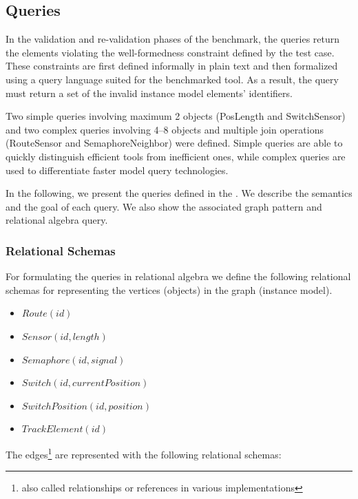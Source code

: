 \subsection{Queries}
\label{sec:queries}

In the validation and re-validation phases of the benchmark, the queries return the elements violating the well-formedness constraint defined by the test case. These constraints are first defined informally in plain text and then formalized using a query language suited for the benchmarked tool. As a result, the query must return a set of the invalid instance model elements' identifiers.
 
Two simple queries involving maximum 2 objects (\textsf{PosLength} and \textsf{SwitchSensor}) and two complex queries involving 4--8 objects and multiple join operations (\textsf{RouteSensor} and \textsf{SemaphoreNeighbor}) were defined. Simple queries are able to quickly distinguish efficient tools from inefficient ones, while complex queries are used to differentiate faster model query technologies.
 
In the following, we present the queries defined in the \tb{}. We describe the semantics and the goal of each query. We also show the associated graph pattern and relational algebra query.

\subsubsection{Relational Schemas}

For formulating the queries in relational algebra we define the following relational schemas for representing the vertices (objects) in the graph (instance model).

\begin{itemize}
  \item $ \mathit{Route}\left(\mathit{id}\right) $
  \item $ \mathit{Sensor}\left(\mathit{id}, \mathit{length}\right) $
  \item $ \mathit{Semaphore}\left(\mathit{id}, \mathit{signal}\right) $
  \item $ \mathit{Switch}\left(\mathit{id}, \mathit{currentPosition}\right) $
  \item $ \mathit{SwitchPosition}\left(\mathit{id}, \mathit{position}\right) $
  \item $ \mathit{TrackElement}\left(\mathit{id}\right) $
\end{itemize}

The edges\footnote{also called relationships or references in various implementations} are represented with the following relational schemas:

